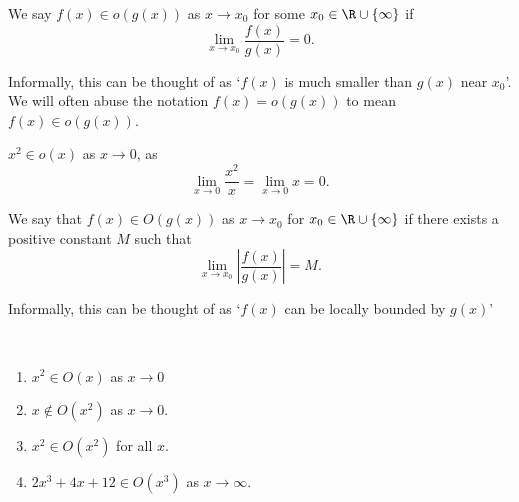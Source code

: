 \documentclass[a4paper]{scrreprt}
\begin{document}
\begin{definition}
	We say $f(x) \in o(g(x))$ as $x \rightarrow x_0$ for some $x_0 \in \R\cup \{\infty\}$ if
	$$
	\lim_{x \to x_0} \frac{f(x)}{g(x)} = 0.
	$$
\end{definition}
\begin{remark}
	Informally, this can be thought of as `$f(x)$ is much smaller than $g(x)$ near $x_0$'. We will often abuse the notation $f(x) = o(g(x))$ to mean $f(x) \in o(g(x))$.
\end{remark}

\begin{example}
	$x^2 \in o(x)$ as $x \rightarrow 0$, as
	$$
	\lim_{x \rightarrow 0} \frac{x^2}{x} = \lim_{x \rightarrow 0} x = 0.
	$$
\end{example}

\begin{definition}
	We say that $f(x) \in O(g(x))$ as $x \rightarrow x_0$ for $x_0 \in \R \cup \{\infty\}$ if there exists a positive constant $M$ such that
	$$
	\lim_{x \to x_0} \left|\frac{f(x)}{g(x)}\right| = M.
	$$
\end{definition}
\begin{remark}
	Informally, this can be thought of as `$f(x)$ can be locally bounded by $g(x)$'
\end{remark}

\begin{example}~
	    \vspace*{-\baselineskip}
	\begin{enumerate}[label=(\roman*)]
		\item $x^2 \in O(x)$ as $x \rightarrow 0$
		\item $x \not\in O(x^2)$ as $x \rightarrow 0$.
		\item $x^2 \in O(x^2)$ for all $x$.
		\item $2x^3 + 4x + 12 \in O(x^3)$ as $x \rightarrow \infty$.
	\end{enumerate}

\end{example}
\end{document}
